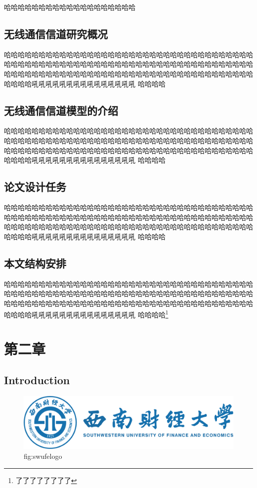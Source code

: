 \documentclass[UTF8,twoside,zihao=-4]{ctexbook}
\begin{document}
	哈哈哈哈哈哈哈哈哈哈哈哈哈哈哈哈哈哈哈
	\section{无线通信信道研究概况}
	哈哈哈哈哈哈哈哈哈哈哈哈哈哈哈哈哈哈哈哈哈哈哈哈哈哈哈哈哈哈哈哈哈哈哈哈哈哈哈哈哈哈哈哈哈哈哈哈哈哈哈哈哈哈哈哈哈哈哈哈哈哈哈哈哈哈哈哈哈哈哈哈哈哈哈哈哈哈哈哈哈哈哈哈哈哈哈哈哈哈哈哈哈哈哈哈哈哈哈哈哈哈哈哈哈哈哈哈哈哈哈哈吼吼吼吼吼吼吼吼吼吼吼吼吼吼吼
	哈哈哈哈
	\section{无线通信信道模型的介绍}
	哈哈哈哈哈哈哈哈哈哈哈哈哈哈哈哈哈哈哈哈哈哈哈哈哈哈哈哈哈哈哈哈哈哈哈哈哈哈哈哈哈哈哈哈哈哈哈哈哈哈哈哈哈哈哈哈哈哈哈哈哈哈哈哈哈哈哈哈哈哈哈哈哈哈哈哈哈哈哈哈哈哈哈哈哈哈哈哈哈哈哈哈哈哈哈哈哈哈哈哈哈哈哈哈哈哈哈哈哈哈哈哈吼吼吼吼吼吼吼吼吼吼吼吼吼吼吼
	哈哈哈哈
	\section{论文设计任务}
	哈哈哈哈哈哈哈哈哈哈哈哈哈哈哈哈哈哈哈哈哈哈哈哈哈哈哈哈哈哈哈哈哈哈哈哈哈哈哈哈哈哈哈哈哈哈哈哈哈哈哈哈哈哈哈哈哈哈哈哈哈哈哈哈哈哈哈哈哈哈哈哈哈哈哈哈哈哈哈哈哈哈哈哈哈哈哈哈哈哈哈哈哈哈哈哈哈哈哈哈哈哈哈哈哈哈哈哈哈哈哈哈吼吼吼吼吼吼吼吼吼吼吼吼吼吼吼
	哈哈哈哈
	\section{本文结构安排}
	哈哈哈哈哈哈哈哈哈哈哈哈哈哈哈哈哈哈哈哈哈哈哈哈哈哈哈哈哈哈哈哈哈哈哈哈哈哈哈哈哈哈哈哈哈哈哈哈哈哈哈哈哈哈哈哈哈哈哈哈哈哈哈哈哈哈哈哈哈哈哈哈哈哈哈哈哈哈哈哈哈哈哈哈哈哈哈哈哈哈哈哈哈哈哈哈哈哈哈哈哈哈哈哈哈哈哈哈哈哈哈哈吼吼吼吼吼吼吼吼吼吼吼吼吼吼吼
	哈哈哈哈\footnote{了了了了了了了了}
	
	\chapter{第二章}
	
	\section{Introduction}
	
\begin{figure}
	\centering
	\includegraphics[width=0.7\linewidth]{pic_of_cover/swufelogo}
	\caption{fig:swufelogo}
	\label{fig:swufelogo}
\end{figure}
	
\end{document}
